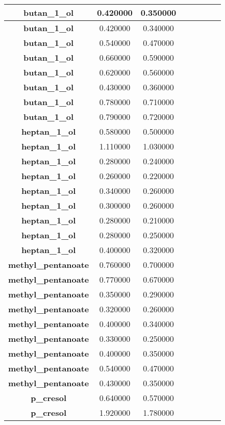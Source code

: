 \documentclass{amsart}
\begin{document}
\begin{center}
\begin{tabular}{c|c|c|c|c|c|c|c}
\textbf{butan\_1\_ol}&0.420000&0.350000 \\ \hline 
\textbf{butan\_1\_ol}&0.420000&0.340000 \\ \hline 
\textbf{butan\_1\_ol}&0.540000&0.470000 \\ \hline 
\textbf{butan\_1\_ol}&0.660000&0.590000 \\ \hline 
\textbf{butan\_1\_ol}&0.620000&0.560000 \\ \hline 
\textbf{butan\_1\_ol}&0.430000&0.360000 \\ \hline 
\textbf{butan\_1\_ol}&0.780000&0.710000 \\ \hline 
\textbf{butan\_1\_ol}&0.790000&0.720000 \\ \hline 
\textbf{heptan\_1\_ol}&0.580000&0.500000 \\ \hline 
\textbf{heptan\_1\_ol}&1.110000&1.030000 \\ \hline 
\textbf{heptan\_1\_ol}&0.280000&0.240000 \\ \hline 
\textbf{heptan\_1\_ol}&0.260000&0.220000 \\ \hline 
\textbf{heptan\_1\_ol}&0.340000&0.260000 \\ \hline 
\textbf{heptan\_1\_ol}&0.300000&0.260000 \\ \hline 
\textbf{heptan\_1\_ol}&0.280000&0.210000 \\ \hline 
\textbf{heptan\_1\_ol}&0.280000&0.250000 \\ \hline 
\textbf{heptan\_1\_ol}&0.400000&0.320000 \\ \hline 
\textbf{methyl\_pentanoate}&0.760000&0.700000 \\ \hline 
\textbf{methyl\_pentanoate}&0.770000&0.670000 \\ \hline 
\textbf{methyl\_pentanoate}&0.350000&0.290000 \\ \hline 
\textbf{methyl\_pentanoate}&0.320000&0.260000 \\ \hline 
\textbf{methyl\_pentanoate}&0.400000&0.340000 \\ \hline 
\textbf{methyl\_pentanoate}&0.330000&0.250000 \\ \hline 
\textbf{methyl\_pentanoate}&0.400000&0.350000 \\ \hline 
\textbf{methyl\_pentanoate}&0.540000&0.470000 \\ \hline 
\textbf{methyl\_pentanoate}&0.430000&0.350000 \\ \hline 
\textbf{p\_cresol}&0.640000&0.570000 \\ \hline 
\textbf{p\_cresol}&1.920000&1.780000 \\ \hline 

\end{tabular}
\end{center}
\end{document}
